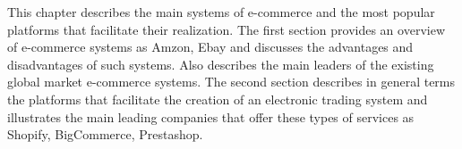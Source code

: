 This chapter describes the main systems of e-commerce and the most popular platforms that facilitate their realization.
The first section provides an overview of e-commerce systems as Amzon, Ebay and discusses the advantages and disadvantages of such systems. Also describes the main leaders of the existing global market e-commerce systems. The second section describes in general terms the platforms that facilitate the creation of an electronic trading system and illustrates the main leading companies that offer these types of services as Shopify, BigCommerce, Prestashop.